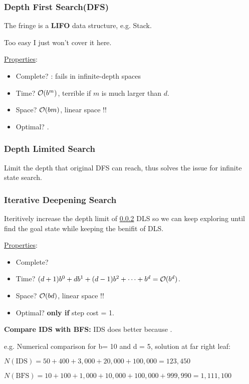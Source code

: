 \documentclass{ainote}
\begin{document}
\subsubsection{Depth First Search(DFS)}
The fringe is a \textbf{LIFO} data structure, e.g. Stack.

Too easy I just won't cover it here.

\underline{Properties}:
\begin{itemize}
    \item Complete? : fails in infinite-depth spaces
    \item Time? $\mathcal{O}(b^m)$, terrible if $m$ is much larger than $d$.
    \item Space? $\mathcal{O}(bm)$, linear space !!
    \item Optimal? .
\end{itemize}

\subsubsection{Depth Limited Search}
\label{Depth Limited Search}
Limit the depth that original DFS can reach, thus solves the issue for infinite state search.


\subsubsection{Iterative Deepening Search}
Iteritively increase the depth limit of \ref{Depth Limited Search} DLS so we can keep exploring until find the goal state while keeping the benifit of DLS.


\underline{Properties}:
\begin{itemize}
    \item Complete? 
    \item Time? $(d+1)b^0+db^1+(d-1)b^2+\dots+b^d=\mathcal{O}(b^d)$.
    \item Space? $\mathcal{O}(bd)$, linear space !!
    \item Optimal?  \textbf{only if} step cost = 1.
\end{itemize}

\begin{info}
    \textbf{Compare IDS with BFS:} IDS does better because .

    e.g. Numerical comparison for b= 10 and d = 5, solution at far right leaf:
    
    $N(\text{IDS})=50 + 400 + 3, 000 + 20, 000 + 100, 000 = 123, 450$

    $N(\text{BFS})=10 + 100 + 1, 000 + 10, 000 + 100, 000 + 999, 990 = 1, 111, 100$
\end{info}
\end{document}
